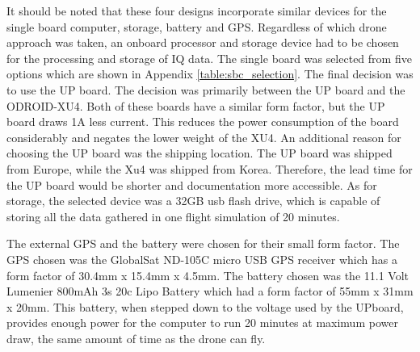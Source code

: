 It should be noted that these four designs incorporate similar devices for the single board computer, storage, battery and GPS. Regardless of which drone approach was taken, an onboard processor and storage device had to be chosen for the processing and storage of IQ data. The single board was selected from five options which are shown in Appendix \ref{table:sbc_selection}. The final decision was to use the UP board. The decision was primarily between the UP board and the ODROID-XU4. Both of these boards have a similar form factor, but the UP board draws 1A less current. This reduces the power consumption of the board considerably and negates the lower weight of the XU4. An additional reason for choosing the UP board was the shipping location. The UP board was shipped from Europe, while the Xu4 was shipped from Korea. Therefore, the lead time for the UP board would be shorter and documentation more accessible. As for storage, the selected device was a 32GB usb flash drive, which is capable of storing all the data gathered in one flight simulation of 20 minutes. \par

The external GPS and the battery were chosen for their small form factor. The GPS chosen was the GlobalSat ND-105C micro USB GPS receiver which has a form factor of 30.4mm x 15.4mm x 4.5mm. The battery chosen was the 11.1 Volt Lumenier 800mAh 3s 20c Lipo Battery which had a form factor of 55mm x 31mm x 20mm. This battery, when stepped down to the voltage used by the UPboard, provides enough power for the computer to run 20 minutes at maximum power draw, the same amount of time as the drone can fly. 

